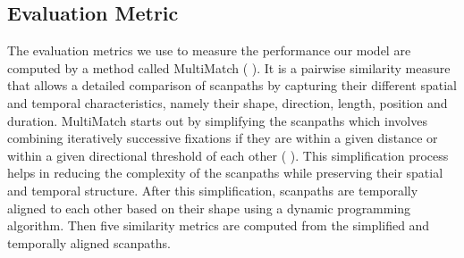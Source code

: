 \documentclass{article} %
\begin{document}
\subsection{Evaluation Metric}
The evaluation metrics we use to measure the performance our model are computed by a method called MultiMatch (\cite{7ccdec072dc945c4a0138a73aedd0132} ).
It is a pairwise similarity measure that allows a detailed comparison of scanpaths by capturing their different spatial and temporal characteristics, namely their shape, direction, length, position and duration. MultiMatch starts out by simplifying the scanpaths 
which involves combining iteratively successive fixations if they are within a given distance or
within a given directional threshold of each other (\cite{Anderson2015} ). This simplification process helps in reducing the complexity of the scanpaths while preserving their spatial and temporal structure. After this simplification, scanpaths are temporally aligned to each other based
on their shape using a dynamic programming algorithm. Then five similarity metrics are computed from the simplified and temporally aligned scanpaths.
\end{document}
